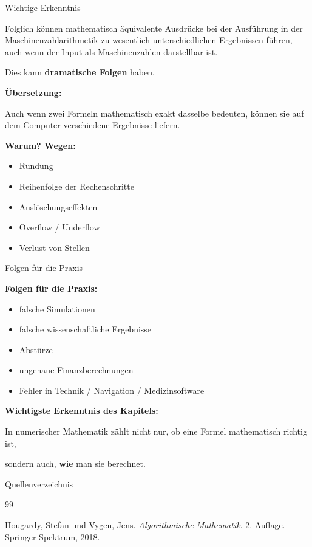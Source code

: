 \documentclass{beamer}
\begin{document}
\begin{frame}{Wichtige Erkenntnis}

\small

Folglich können mathematisch äquivalente Ausdrücke bei der Ausführung
in der Maschinenzahlarithmetik zu wesentlich unterschiedlichen Ergebnissen führen,
auch wenn der Input als Maschinenzahlen darstellbar ist.

\vspace{0.4cm}

Dies kann \textbf{dramatische Folgen} haben.

\vspace{0.6cm}

\textbf{Übersetzung:}

Auch wenn zwei Formeln mathematisch exakt dasselbe bedeuten,
können sie auf dem Computer verschiedene Ergebnisse liefern.

\vspace{0.6cm}

\textbf{Warum? Wegen:}

\begin{itemize}
\item Rundung
\item Reihenfolge der Rechenschritte
\item Auslöschungseffekten
\item Overflow / Underflow
\item Verlust von Stellen
\end{itemize}

\end{frame}

\begin{frame}{Folgen für die Praxis}

\small

\textbf{Folgen für die Praxis:}

\begin{itemize}
\item falsche Simulationen
\item falsche wissenschaftliche Ergebnisse
\item Abstürze
\item ungenaue Finanzberechnungen
\item Fehler in Technik / Navigation / Medizinsoftware
\end{itemize}

\vspace{0.8cm}

\textbf{Wichtigste Erkenntnis des Kapitels:}

In numerischer Mathematik zählt nicht nur,
ob eine Formel mathematisch richtig ist,

sondern auch, \textbf{wie} man sie berechnet.

\end{frame}

\begin{frame}{Quellenverzeichnis}

\begin{thebibliography}{99}

\bibitem{}
Hougardy, Stefan und Vygen, Jens.
\textit{Algorithmische Mathematik}.
2. Auflage.
Springer Spektrum, 2018.

\end{thebibliography}

\end{frame}
\end{document}

